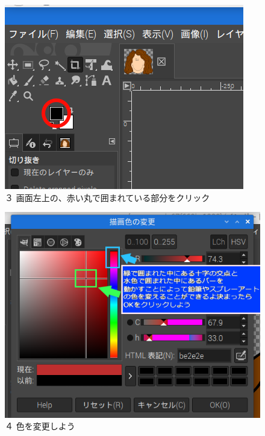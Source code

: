 \documentclass[a4paper,12pt]{jarticle}
\begin{document}
\begin{figure}[ht]
\begin{minipage}{\textwidth}
  \end{minipage}

  \bigskip
  
  \begin{minipage}{\textwidth}
    \begin{minipage}{0.45\linewidth}
      \includegraphics[width=\linewidth]{textbook-img129.png}\\
      ３ 画面左上の、赤い丸で囲まれている部分をクリック
    \end{minipage}
    \hfill
    \begin{minipage}{0.45\linewidth}
      \includegraphics[width=\linewidth]{textbook-img126.png}\\
      ４ 色を変更しよう


\end{minipage}
\end{minipage}
\end{figure}
\end{document}
